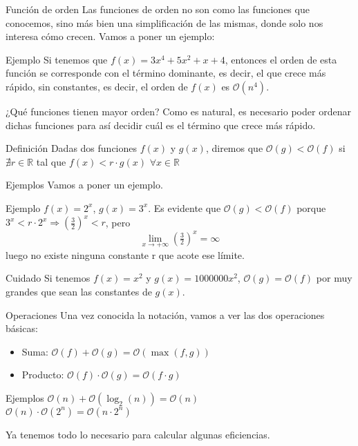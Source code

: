 \documentclass[compress]{beamer}
\begin{document}
\begin{frame}{Función de orden}
Las funciones de orden no son como las funciones que conocemos, sino más bien una simplificación de las mismas, donde solo nos interesa cómo crecen. Vamos a poner un ejemplo:
	\begin{exampleblock}{Ejemplo}
	Si tenemos que $f(x) = 3x^4 + 5x^2 + x + 4$, entonces el orden de esta función se corresponde con el término dominante, es decir, el que crece más rápido, sin constantes, es decir, el orden de $f(x)$ es $\mathcal{O}(n^4)$.
	\end{exampleblock}
\end{frame}

\begin{frame}{¿Qué funciones tienen mayor orden?}
Como es natural, es necesario poder ordenar dichas funciones para así decidir cuál es el término que crece más rápido.\\
\vspace{0.20in}
	\begin{block}{Definición}
	Dadas dos funciones $f(x)$ y $g(x)$, diremos que $\mathcal{O}(g) < \mathcal{O}(f)$ si $\nexists r\in \mathbb{R}$ tal que $f(x) < r\cdot g(x)$ $\forall x\in \mathbb{R}$
	\end{block}
\end{frame}

\begin{frame}{Ejemplos}
Vamos a poner un ejemplo.\\
\vspace{0.20in}
	\begin{exampleblock}{Ejemplo}
	$f(x) = 2^x$, $g(x) = 3^x$. Es evidente que $\mathcal{O}(g) < \mathcal{O}(f)$ porque $3^x < r\cdot2^x \Rightarrow (\tfrac{3}{2})^x < r$, pero \[\lim_{x \to +\infty}(\tfrac{3}{2})^x = \infty\]luego  no existe ninguna constante r que acote ese límite.
	\end{exampleblock}
	
	\begin{alertblock}{Cuidado}
	Si tenemos $f(x) = x^2$ y $g(x) = 1000000x^2$, $\mathcal{O}(g) = \mathcal{O}(f)$ por muy grandes que sean las constantes de $g(x)$.
	\end{alertblock}
\end{frame}

\begin{frame}{Operaciones}
Una vez conocida la notación, vamos a ver las dos operaciones básicas:
	\begin{itemize}
	\item Suma: $\mathcal{O}(f) + \mathcal{O}(g) = \mathcal{O}(\max(f,g))$
	\item Producto: $\mathcal{O}(f) \cdot \mathcal{O}(g) = \mathcal{O}(f\cdot g)$
	\end{itemize}
	
	\begin{exampleblock}{Ejemplos}
	$\mathcal{O}(n) + \mathcal{O}(\log_2(n)) = \mathcal{O}(n)$\\
	$\mathcal{O}(n) \cdot \mathcal{O}(2^n) = \mathcal{O}(n\cdot2^n)$
	\end{exampleblock}
\vspace{0.20in}
Ya tenemos todo lo necesario para calcular algunas eficiencias.
\end{frame}
\end{document}
